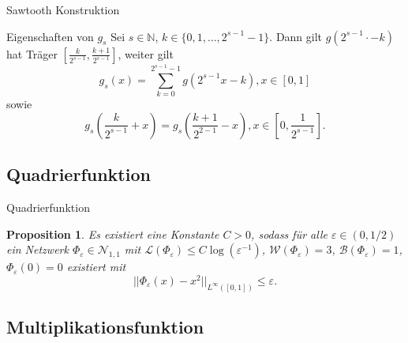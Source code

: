 \documentclass[10pt,aspectratio=169]{beamer}
\newtheorem{proposition}[theorem]{Proposition}
\newcommand{\N}{\mathbb{N}} %
\newcommand{\set}[1]{\{#1\}}
\begin{document}
\begin{frame}{Sawtooth Konstruktion}
\begin{center}
    \end{center}
\end{frame}

\begin{frame}{Eigenschaften von \(g_s\)}
    Sei \(s\in\N\), \(k \in \set{0,1,\ldots, 2^{s-1}-1}\). Dann gilt \(g(2^{s-1} \cdot - k)\) 
    hat Träger \([\frac{k}{2^{s-1}}, \frac{k+1}{2^{s-1}}]\), weiter gilt 
    \[ g_s(x) = \sum_{k=0}^{2^{s-1}-1} g(2^{s-1}x - k), x\in [0,1] \]
    sowie 
    \[ g_s\left(\frac{k}{2^{s-1}}+x\right) = g_s\left(\frac{k+1}{2^{2-1}} - x\right), x \in \left[0, \frac{1}{2^{s-1}} \right]. \]
\end{frame}

\subsection{Quadrierfunktion}

\begin{frame}{Quadrierfunktion}
    \begin{proposition} %
        Es existiert eine Konstante \(C>0\), sodass für alle \(\varepsilon \in (0,1/2)\) 
        ein Netzwerk \(\Phi_\varepsilon \in \mathcal{N}_{1,1}\) mit 
        \(\mathcal{L}(\Phi_\varepsilon) \leq C\log(\varepsilon^{-1})\), 
        \(\mathcal{W}(\Phi_\varepsilon) = 3\), \(\mathcal{B}(\Phi_\varepsilon) = 1\), 
        \(\Phi_\varepsilon(0) = 0\) existiert mit 
        \[ ||\Phi_\varepsilon(x) - x^2 ||_{L^\infty([0,1])} \leq \varepsilon. \]
    \end{proposition}
\end{frame}

\subsection{Multiplikationsfunktion}
\end{document}
